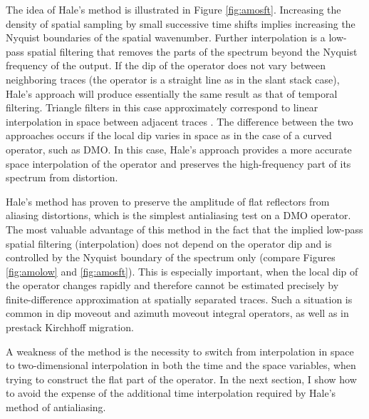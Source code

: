 The idea of Hale's method is illustrated in Figure \ref{fig:amosft}.
Increasing the density of spatial sampling by small successive time
shifts implies increasing the Nyquist boundaries of the spatial
wavenumber. Further interpolation is a low-pass spatial filtering that
removes the parts of the spectrum beyond the Nyquist frequency of the
output. If the dip of the operator does not vary between neighboring
traces (the operator is a straight line as in the slant stack case),
Hale's approach will produce essentially the same result as that of
temporal filtering. Triangle filters in this case approximately
correspond to linear interpolation in space between adjacent traces
\cite[]{Nichols.sep.77.283}. The difference between the two approaches
occurs if the local dip varies in space as in the case of a curved
operator, such as DMO. In this case, Hale's approach provides a more
accurate space interpolation of the operator and preserves the
high-frequency part of its spectrum from distortion.


Hale's method has proven to preserve the amplitude of flat reflectors
from aliasing distortions, which is the simplest antialiasing test on
a DMO operator. The most valuable advantage of this method in the fact
that the implied low-pass spatial filtering (interpolation) does not
depend on the operator dip and is controlled by the Nyquist boundary
of the spectrum only (compare Figures \ref{fig:amolow} and
\ref{fig:amosft}). This is especially important, when the local dip of
the operator changes rapidly and therefore cannot be estimated
precisely by finite-difference approximation at spatially separated
traces. Such a situation is common in dip moveout and azimuth moveout
integral operators, as well as in prestack Kirchhoff migration.

A weakness of the method is the necessity to switch from
interpolation in space to two-dimensional interpolation in both the
time and the space variables, when trying to construct the flat part
of the operator. 
In the next section, I show how to avoid the expense of the additional
time interpolation required by Hale's method of antialiasing.

